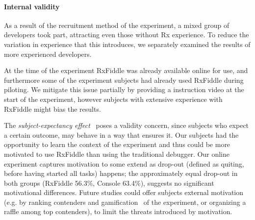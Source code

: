 \paragraph{Internal validity} As a result of the recruitment method of
the experiment, a mixed group of developers took part, attracting even
those without Rx experience.  To reduce the variation in experience that
this introduces, we separately examined the results of more experienced
developers.

At the time of the experiment RxFiddle was already available online for
use, and furthermore some of the experiment subjects had already used
RxFiddle during piloting.  We mitigate this issue partially by providing
a instruction video at the start of the experiment, however subjects
with extensive experience with RxFiddle might bias the results.

The \emph{subject-expectancy effect}~\cite{ko2015practical} poses a
validity concern, since subjects who expect a certain outcome, may
behave in a way that ensures it.  Our subjects had the opportunity to
learn the context of the experiment and thus could be more motivated to
use RxFiddle than using the traditional debugger.  Our online experiment
captures motivation to some extend as drop-out (defined as quiting,
before having started all tasks) happens; the approximately equal
drop-out in both groups (RxFiddle 56.3\%, Console 63.4\%), suggests no
significant motivational differences.  Future studies could offer subjects
external motivation (e.g. by ranking contenders and gamification~
\cite{dicheva2015gamification} of the experiment, or organizing a
raffle among top contenders), to limit the threats introduced by motivation.
